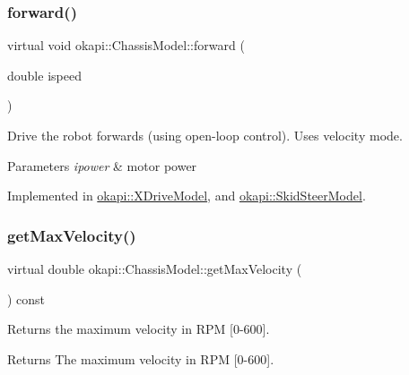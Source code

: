 \mbox{\label{classokapi_1_1ChassisModel_ae39e8ccd15b6f84e32cd21fe99bdd6c9}} 
\subsubsection{\texorpdfstring{forward()}{forward()}}
{\footnotesize\ttfamily virtual void okapi\+::\+Chassis\+Model\+::forward (\begin{DoxyParamCaption}\item[{double}]{ispeed }\end{DoxyParamCaption})\hspace{0.3cm}{\ttfamily [pure virtual]}}

Drive the robot forwards (using open-\/loop control). Uses velocity mode.


\begin{DoxyParams}{Parameters}
{\em ipower} & motor power \\
\hline
\end{DoxyParams}


Implemented in \mbox{\hyperlink{classokapi_1_1XDriveModel_a2a26c9bd57c26ca0251040a14272226c}{okapi\+::\+X\+Drive\+Model}}, and \mbox{\hyperlink{classokapi_1_1SkidSteerModel_a74ca9d9f1b0f80c9453194567c58e967}{okapi\+::\+Skid\+Steer\+Model}}.

\mbox{\label{classokapi_1_1ChassisModel_ab45dd7430636ed1c1dee25dae6df5d46}} 
\subsubsection{\texorpdfstring{getMaxVelocity()}{getMaxVelocity()}}
{\footnotesize\ttfamily virtual double okapi\+::\+Chassis\+Model\+::get\+Max\+Velocity (\begin{DoxyParamCaption}{ }\end{DoxyParamCaption}) const\hspace{0.3cm}{\ttfamily [pure virtual]}}

Returns the maximum velocity in R\+PM \mbox{[}0-\/600\mbox{]}.

\begin{DoxyReturn}{Returns}
The maximum velocity in R\+PM \mbox{[}0-\/600\mbox{]}. 
\end{DoxyReturn}



